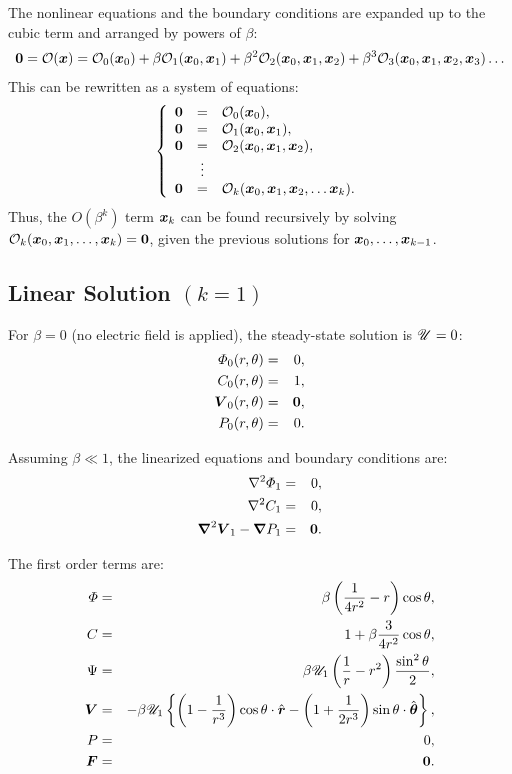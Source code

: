 The nonlinear equations and the boundary conditions are expanded up to the cubic term
and arranged by powers of $\beta$:
\begin{eqnarray}
\bzero = \cO(\bx) = \cO_0(\bx_0) 
   + \beta \cO_1(\bx_0, \bx_1) 
 + \beta^2 \cO_2(\bx_0, \bx_1, \bx_2) 
 + \beta^3 \cO_3(\bx_0, \bx_1, \bx_2, \bx_3) \ldots
\end{eqnarray}
This can be rewritten as a system of equations:
\begin{eqnarray}
\brc{rcl}{
\bzero &=& \cO_0(\bx_0), \\
\bzero &=& \cO_1(\bx_0, \bx_1), \\
\bzero &=& \cO_2(\bx_0, \bx_1, \bx_2), \\
& \vdots & \\
\bzero &=& \cO_k(\bx_0, \bx_1, \bx_2, \ldots \bx_k).
}
\end{eqnarray}
Thus, the $O(\beta^k)$ term $\bx_k$ can be found recursively by solving 
$\cO_k(\bx_0, \bx_1, \ldots, \bx_k) = \bzero$,
given the previous solutions for $\bx_0, \ldots, \bx_{k-1}$.

\subsection{Linear Solution $(k=1)$}

For $\beta = 0$ (no electric field is applied), the steady-state solution is $\cU = 0$:
\begin{eqnarray}
\varPhi_0(r,\theta) &=& 0, \\
C_0(r,\theta) &=& 1, \\
\bV_0(r,\theta) &=& \bzero, \\
P_0(r,\theta) &=& 0.
\end{eqnarray}

Assuming $\beta \ll 1$, the linearized equations and boundary conditions are:
\begin{eqnarray}
\Laplacian \varPhi_1 &=& 0, \\
\Laplacian C_1 &=& 0, \\
\bLaplacian \bV_1 - \bnabla P_1 &=& \bzero.
\end{eqnarray}

The first order terms are:
\begin{eqnarray}
\varPhi &=& \beta \pars{\frac{1}{4r^2} - r}\cos\theta, \\
C &=& 1 + \beta \frac{3}{4r^2} \cos\theta, \\
\Psi &=& \beta \cU_1 \pars{\frac{1}{r} - r^2} \frac{\sin^2\theta}{2}, \\
\bV &=& -\beta \cU_1 \brcs{\pars{1 - \frac{1}{r^3}}\cos\theta \cdot \brhat - 
                               \pars{1 + \frac{1}{2r^3}} \sin\theta \cdot \bthetahat}, \\
P &=& 0, \\
\bF &=& \bzero.
\end{eqnarray}

